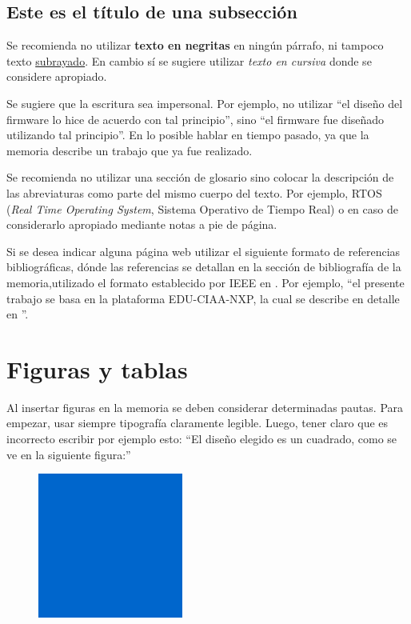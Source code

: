 \subsection{Este es el título de una subsección}
\label{subsec:ejemplo}

Se recomienda no utilizar \textbf{texto en negritas} en ningún párrafo, ni tampoco texto \underline{subrayado}. En cambio sí se sugiere utilizar \textit{texto en cursiva} donde se considere apropiado.

Se sugiere que la escritura sea impersonal. Por ejemplo, no utilizar ``el diseño del firmware lo hice de acuerdo con tal principio'', sino ``el firmware fue diseñado utilizando tal principio''. En lo posible hablar en tiempo pasado, ya que la memoria describe un trabajo que ya fue realizado.

Se recomienda no utilizar una sección de glosario sino colocar la descripción de las abreviaturas como parte del mismo cuerpo del texto. Por ejemplo, RTOS (\textit{Real Time Operating System}, Sistema Operativo de Tiempo Real) o en caso de considerarlo apropiado mediante notas a pie de página.

Si se desea indicar alguna página web utilizar el siguiente formato de referencias bibliográficas, dónde las referencias se detallan en la sección de bibliografía de la memoria,utilizado el formato establecido por IEEE en \citep{IEEE:citation}. Por ejemplo, ``el presente trabajo se basa en la plataforma EDU-CIAA-NXP, la cual se describe en detalle en \citep{CIAA}''.

\section{Figuras y tablas} 

Al insertar figuras en la memoria se deben considerar determinadas pautas. Para empezar, usar siempre tipografía claramente legible. Luego, tener claro que es incorrecto escribir por ejemplo esto: ``El diseño elegido es un cuadrado,  como se ve en la siguiente figura:''

\begin{figure}[h]
\centering
\includegraphics[scale=.4]{./Figures/cuadradoAzul.png}
\end{figure}

